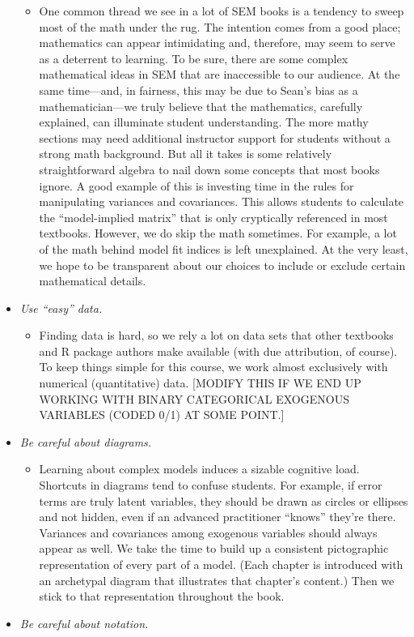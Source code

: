 \documentclass[
]{book}
\providecommand{\tightlist}{%
  \setlength{\itemsep}{0pt}\setlength{\parskip}{0pt}}
\begin{document}
\begin{itemize}
  \begin{itemize}
  \tightlist
  \item
    One common thread we see in a lot of SEM books is a tendency to sweep most of the math under the rug. The intention comes from a good place; mathematics can appear intimidating and, therefore, may seem to serve as a deterrent to learning. To be sure, there are some complex mathematical ideas in SEM that are inaccessible to our audience. At the same time---and, in fairness, this may be due to Sean's bias as a mathematician---we truly believe that the mathematics, carefully explained, can illuminate student understanding. The more mathy sections may need additional instructor support for students without a strong math background. But all it takes is some relatively straightforward algebra to nail down some concepts that most books ignore. A good example of this is investing time in the rules for manipulating variances and covariances. This allows students to calculate the ``model-implied matrix'' that is only cryptically referenced in most textbooks. However, we do skip the math sometimes. For example, a lot of the math behind model fit indices is left unexplained. At the very least, we hope to be transparent about our choices to include or exclude certain mathematical details.
  \end{itemize}
\item
  \emph{Use ``easy'' data.}

  \begin{itemize}
  \tightlist
  \item
    Finding data is hard, so we rely a lot on data sets that other textbooks and R package authors make available (with due attribution, of course). To keep things simple for this course, we work almost exclusively with numerical (quantitative) data. {[}MODIFY THIS IF WE END UP WORKING WITH BINARY CATEGORICAL EXOGENOUS VARIABLES (CODED 0/1) AT SOME POINT.{]}
  \end{itemize}
\item
  \emph{Be careful about diagrams.}

  \begin{itemize}
  \tightlist
  \item
    Learning about complex models induces a sizable cognitive load. Shortcuts in diagrams tend to confuse students. For example, if error terms are truly latent variables, they should be drawn as circles or ellipses and not hidden, even if an advanced practitioner ``knows'' they're there. Variances and covariances among exogenous variables should always appear as well. We take the time to build up a consistent pictographic representation of every part of a model. (Each chapter is introduced with an archetypal diagram that illustrates that chapter's content.) Then we stick to that representation throughout the book.
  \end{itemize}
\item
  \emph{Be careful about notation.}


\end{itemize}
\end{document}
